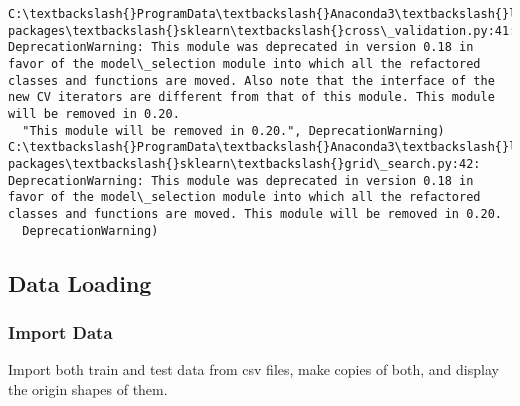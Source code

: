 \documentclass[11pt]{article}
\begin{document}
    \begin{Verbatim}[commandchars=\\\{\}]
C:\textbackslash{}ProgramData\textbackslash{}Anaconda3\textbackslash{}lib\textbackslash{}site-packages\textbackslash{}sklearn\textbackslash{}cross\_validation.py:41: DeprecationWarning: This module was deprecated in version 0.18 in favor of the model\_selection module into which all the refactored classes and functions are moved. Also note that the interface of the new CV iterators are different from that of this module. This module will be removed in 0.20.
  "This module will be removed in 0.20.", DeprecationWarning)
C:\textbackslash{}ProgramData\textbackslash{}Anaconda3\textbackslash{}lib\textbackslash{}site-packages\textbackslash{}sklearn\textbackslash{}grid\_search.py:42: DeprecationWarning: This module was deprecated in version 0.18 in favor of the model\_selection module into which all the refactored classes and functions are moved. This module will be removed in 0.20.
  DeprecationWarning)

    \end{Verbatim}

    \subsection{Data Loading}\label{data-loading}

    \subsubsection{Import Data}\label{import-data}

Import both train and test data from csv files, make copies of both, and
display the origin shapes of them.
\end{document}
